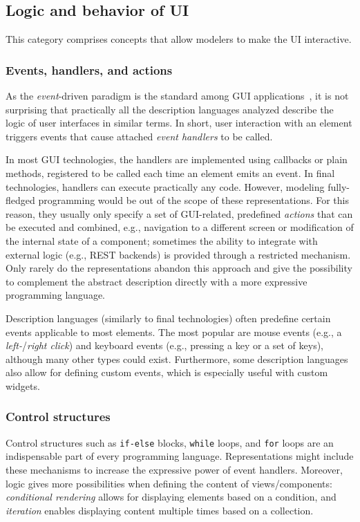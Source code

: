 \subsection{Logic and behavior of UI}\label{subsec:logic-and-behavior-of-ui}

This category comprises concepts that allow modelers to make the UI interactive.

\subsubsection{Events, handlers, and actions}
As the \emph{event}-driven paradigm is the standard among GUI applications~\cite{wang2016event}, it is not surprising that practically all the description languages analyzed describe the logic of user interfaces in similar terms.
In short, user interaction with an element triggers events that cause attached \emph{event handlers} to be called.

In most GUI technologies, the handlers are implemented using callbacks or plain methods, registered to be called each time an element emits an event.
In final technologies, handlers can execute practically any code.
However, modeling fully-fledged programming would be out of the scope of these representations.
For this reason, they usually only specify a set of GUI-related, predefined \emph{actions} that can be executed and combined, e.g., navigation to a different screen or modification of the internal state of a component;
sometimes the ability to integrate with external logic (e.g., REST backends) is provided through a restricted mechanism.
Only rarely do the representations abandon this approach and give the possibility to complement the abstract description directly with a more expressive programming language.

Description languages (similarly to final technologies) often predefine certain events applicable to most elements.
The most popular are mouse events (e.g., a \emph{left-}/\emph{right click}) and keyboard events (e.g., pressing a key or a set of keys), although many other types could exist.
Furthermore, some description languages also allow for defining custom events, which is especially useful with custom widgets.

\subsubsection{Control structures}
Control structures such as \texttt{if-else} blocks, \texttt{while} loops, and \texttt{for} loops are an indispensable part of every programming language.
Representations might include these mechanisms to increase the expressive power of event handlers.
Moreover, logic gives more possibilities when defining the content of views/components: \emph{conditional rendering} allows for displaying elements based on a condition, and \emph{iteration} enables displaying content multiple times based on a collection.

